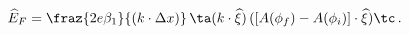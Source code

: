 \begin{equation}
{\widehat E}_F=\fraz{2e\beta_1}{(k\cdot\Delta x)}\,\ta
 (k\cdot\widehat\xi)\,
([A(\phi_f)-A(\phi_i)]\cdot\widehat\xi) \tc\,.
\label{EF}
\end{equation}

